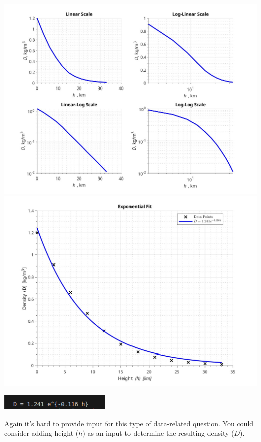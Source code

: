 \documentclass[a4paper, 12pt]{report}
\begin{document}
\includegraphics[width=1\textwidth]{main/graphs_images/subplts.jpeg}
\includegraphics[width=1\textwidth]{main/graphs_images/fitted_curve.jpeg}
\begin{center}
    \includegraphics[width=0.4\textwidth]{main/graphs_images/2screen.png}
\end{center}
Again it's hard to provide input for this type of data-related question. You could consider adding height (\(h\)) as an input to determine the resulting density (\(D\)).


\newpage
\end{document}
